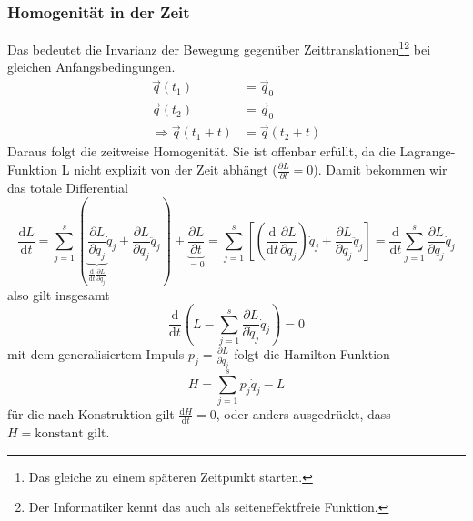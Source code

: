 \documentclass[oneside]{book}
\theoremstyle{definition}
\renewcommand{\d}{\mathrm d}
\newcommand{\dd}[1]{\frac{\d}{\d #1}}
\newcommand{\ddd}[2]{\frac{\d #1}{\d #2}}
\newcommand{\ffpartial}[2]{\frac{\partial #1}{\partial #2}}
\begin{document}
\subsubsection{Homogenität in der Zeit}
Das bedeutet die Invarianz der Bewegung gegenüber Zeittranslationen\footnote{Das gleiche zu einem späteren Zeitpunkt starten.}\footnote{Der Informatiker kennt das auch als seiteneffektfreie Funktion.} bei gleichen Anfangsbedingungen.
\begin{align*}
\vec{q}(t_1) &= \vec{q}_0\\
\vec{q}(t_2) &= \vec{q}_0\\
\Rightarrow \vec{q}(t_1 + t) &= \vec{q}(t_2 + t)
\end{align*}
Daraus folgt die zeitweise Homogenität. Sie ist offenbar erfüllt, da die Lagrange-Funktion L nicht explizit von der Zeit abhängt ($\ffpartial{L}{t} = 0$). Damit bekommen wir das totale Differential
$$\ddd{L}{t} = \sum_{j=1}^{s} (\underbrace{\ffpartial{L}{q_j}}_{\dd t \ffpartial{L}{\dot{q}_j}} \dot{q}_j + \ffpartial{L}{\dot{q}_j} \ddot{q}_j) + \underbrace{\ffpartial{L}{t}}_{= 0} = \sum_{j = 1}^s [ (\dd t \ffpartial{L}{\dot{q}_j}) \dot{q}_j + \ffpartial{L}{\dot{q}_j} \ddot{q}_j] = \dd t \sum_{j=1}^s \ffpartial{L}{\dot{q}_j} \dot{q}_j$$
also gilt insgesamt
$$\dd t (L - \sum_{j=1}^s \ffpartial{L}{\dot{q}_j} \dot{q}_j) = 0$$
mit dem generalisiertem Impuls $p_j = \ffpartial{L}{\dot{q}_j}$ folgt die Hamilton-Funktion
$$H = \sum_{j=1}^s p_j \dot{q}_j - L$$
für die nach Konstruktion gilt $\ddd{H}{t} = 0$, oder anders ausgedrückt, dass $H = \text{konstant}$ gilt.
\end{document}

